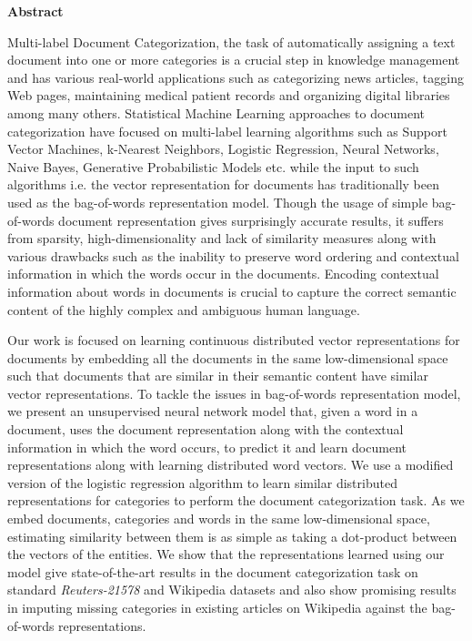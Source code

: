 \begin{center}
\huge{\textbf{Abstract}}
\end{center}

Multi-label Document Categorization, the task of automatically assigning a text document into one or more categories is a crucial step in knowledge management and has various real-world applications such as categorizing news articles, tagging Web pages, maintaining medical patient records and organizing digital libraries among many others. 
Statistical Machine Learning approaches to document categorization have focused on multi-label learning algorithms such as Support Vector Machines, k-Nearest Neighbors, Logistic Regression, Neural Networks, Naive Bayes, Generative Probabilistic Models etc. while the input to such algorithms i.e. the vector representation for documents has traditionally been used as the bag-of-words representation model. 
Though the usage of simple bag-of-words document representation gives surprisingly accurate results, it suffers from sparsity, high-dimensionality and lack of similarity measures along with various drawbacks such as the inability to preserve word ordering and contextual information in which the words occur in the documents. Encoding contextual information about words in documents is crucial to capture the correct semantic content of the highly complex and ambiguous human language.  \hfill \break

Our work is focused on learning continuous distributed vector representations for documents by embedding all the documents in the same low-dimensional space such that documents that are similar in their semantic content have similar vector representations. To tackle the issues in bag-of-words representation model, we present an unsupervised neural network model that, given a word in a document, uses the document representation along with the contextual information in which the word occurs, to predict it and learn document representations along with learning distributed word vectors. 
We use a modified version of the logistic regression algorithm to learn similar distributed representations for categories to perform the document categorization task. As we embed documents, categories and words in the same low-dimensional space, estimating similarity between them is as simple as taking a dot-product between the vectors of the entities. We show that the representations learned using our model give state-of-the-art results in the document categorization task on standard \emph{Reuters-21578} and Wikipedia datasets and also show promising results in imputing missing categories in existing articles on Wikipedia against the bag-of-words representations.
